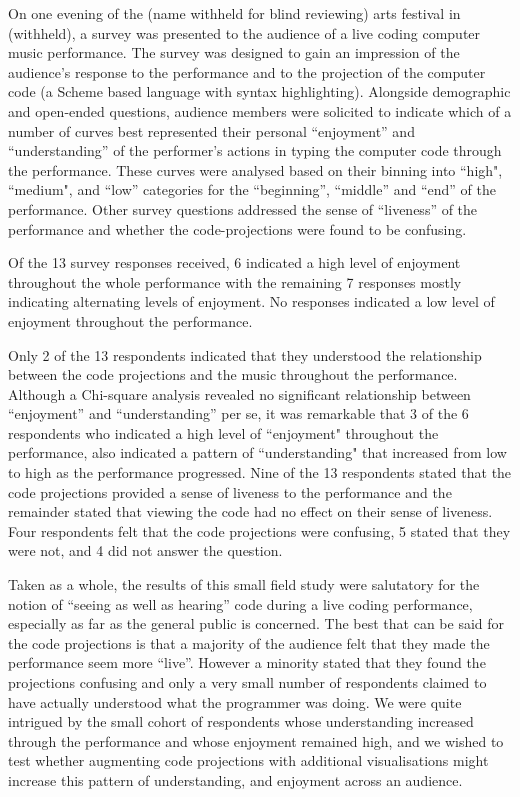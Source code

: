 \documentclass{sig-alternate}
\begin{document}
On one evening of the (name withheld for blind reviewing) arts festival in (withheld), a survey was presented to the audience of a live coding computer music performance. The survey was designed to gain an impression of the audience's response to the performance and to the projection of the computer code (a Scheme based language with syntax highlighting). Alongside demographic and open-ended questions, audience members were solicited to indicate which of a number of curves best represented their personal ``enjoyment'' and ``understanding'' of the performer's actions in typing the computer code through the performance. These curves were analysed based on their binning into ``high", ``medium", and ``low'' categories for the ``beginning'', ``middle'' and ``end'' of the performance. Other survey questions addressed the sense of ``liveness'' of the performance \cite{Auslander} and whether the code-projections were found to be confusing.

Of the 13 survey responses received, 6 indicated a high level of enjoyment throughout the whole performance with the remaining 7 responses mostly indicating alternating levels of enjoyment. No responses indicated a low level of enjoyment throughout the performance.

Only 2 of the 13 respondents indicated that they understood the relationship between the code projections and the music throughout the performance. Although a Chi-square analysis revealed no significant relationship between ``enjoyment'' and ``understanding'' per se, it was remarkable that 3 of the 6 respondents who indicated a high level of ``enjoyment" throughout the performance, also indicated a pattern of ``understanding" that increased from low to high as the performance progressed. Nine of the 13 respondents stated that the code projections provided a sense of liveness to the performance and the remainder stated that viewing the code had no effect on their sense of liveness. Four respondents felt that the code projections were confusing, 5 stated that they were not, and 4 did not answer the question.

Taken as a whole, the results of this small field study were salutatory for the notion of ``seeing as well as hearing'' code during a live coding performance, especially as far as the general public is concerned. The best that can be said for the code projections is that a majority of the audience felt that they made the performance seem more ``live''. However a minority stated that they found the projections confusing and only a very small number of respondents claimed to have actually understood what the programmer was doing. We were quite intrigued by the small cohort of respondents whose understanding increased through the performance and whose enjoyment remained high, and we wished to test whether augmenting code projections with additional visualisations might increase this pattern of understanding, and enjoyment across an audience. 
\end{document}
